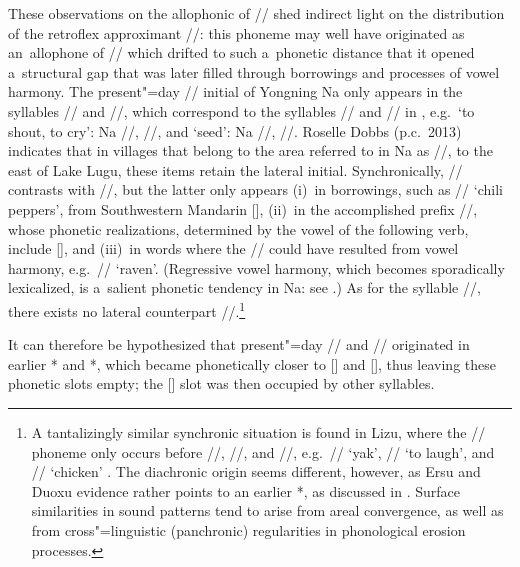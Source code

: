 			These observations on the allophonic  of // shed indirect light on the distribution
			of the retroflex approximant //: this phoneme may well have originated as an~allophone of //
			which drifted to such a~phonetic distance that it opened a~structural gap that was later filled
			through borrowings and processes of vowel harmony. The present"=day // initial of Yongning Na
			only appears in the syllables // and //, which correspond to the syllables
			// and // in , e.g.~‘to shout, to cry’: Na //,  //, and
			‘seed’: Na //,  //. Roselle Dobbs (p.c.\ 2013) indicates that in villages that
			belong to the area referred to in Na as //, to the east of Lake Lugu, these items
			retain the lateral initial. Synchronically, // contrasts with //, but the latter
			only appears (i)~in borrowings, such as // ‘chili peppers’, from Southwestern {Mandarin}
			 [], (ii)~in the {accomplished} prefix //, whose phonetic
			realizations, determined by the vowel of the following verb, include [], and (iii)~in words
			where the // could have resulted from vowel harmony, e.g.~//
			‘raven’. (Regressive vowel harmony, which becomes sporadically lexicalized, is a~salient phonetic
			tendency in Na: see .) As for the syllable //, there
			exists no lateral counterpart //.\footnote{A tantalizingly similar synchronic situation is found in {Lizu}, where the // phoneme only occurs before
			//, //, and //, e.g.~// ‘yak’, // ‘to laugh’, and //
			‘chicken’ \citep{chirkovaetal2012}. The diachronic origin seems different, however, as {Ersu} and {Duoxu} evidence rather points to an earlier *, as discussed in \citet{yu2012}. Surface similarities in sound patterns tend to arise from areal convergence, as well as from cross"=linguistic ({panchronic}) regularities in phonological {erosion} processes.}
			
			It can therefore be hypothesized that present"=day
			// and // originated in earlier * and *, which became
			phonetically closer to [] and [], thus leaving these phonetic slots empty; the
			[] slot was then occupied by other syllables. 
			
